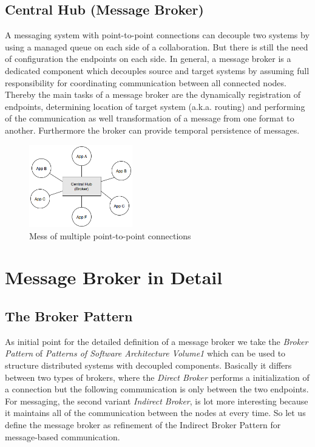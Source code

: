 \subsection{Central Hub (Message Broker)}
\label{intro-messaging-broker}
A messaging system with point-to-point connections can decouple two systems
by using a managed queue on each side of a collaboration. But there is
still the need of configuration the endpoints on each side. In general, a
message broker is a dedicated component which decouples source and
target systems by assuming full responsibility for coordinating communication between
all connected nodes. Thereby the main tasks of a message broker are the
dynamically registration of endpoints, determining location of target system
(a.k.a. routing) and performing of the communication as well transformation of a
message from one format to another. Furthermore the broker can provide temporal
persistence of messages. \cite{MSDNIntegration} \\

\begin{figure}[H]
    \centering
    \includegraphics[width=0.4\textwidth]{images/central-hub.png}
    \caption{Mess of multiple point-to-point connections}
    \label{fig:central-hub}
\end{figure}


\section{Message Broker in Detail}
\subsection{The Broker Pattern }
As initial point for the detailed definition of a message broker we take the
\textit{Broker Pattern} of  \textit{Patterns of Software Architecture Volume1}
which can be used to structure distributed systems with decoupled components.
Basically it differs between two types of brokers, where the \textit{Direct
Broker} performs a initialization of a connection but the following communication
is only between the two endpoints. For messaging, the second variant
\textit{Indirect Broker}, is lot more interesting because it maintains all of
the communication between the nodes at every time. So let us define the message
broker as refinement of the Indirect Broker Pattern for message-based
communication.\cite{POSA1} 

